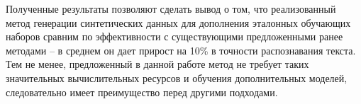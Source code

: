 Полученные результаты позволяют сделать вывод о том, что реализованный метод генерации синтетических данных для дополнения
эталонных обучающих наборов сравним по эффективности с существующими предложенными ранее методами --
в среднем он дает прирост на 10\% в точности распознавания текста.
Тем не менее, предложенный в данной работе метод не требует таких значительных вычислительных ресурсов и обучения дополнительных моделей,
следовательно имеет преимущество перед другими подходами.